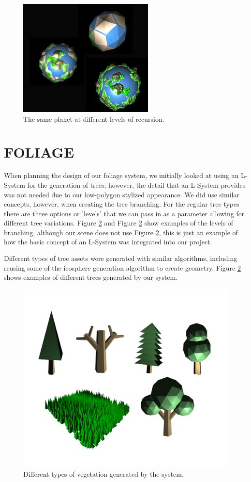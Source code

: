 \documentclass[a4paper,twoside]{article}
\begin{document}
\begin{figure}
\centering
\includegraphics[scale=0.75]{./images/planets/planets.png}
\caption{The same planet at different levels of recursion.}
\label{fig_iterations}
\end{figure}

\section{\uppercase{Foliage}}
\label{sec:fol}
\noindent When planning the design of our foliage system, we initially looked at using an L-System for the generation of trees; however, the detail that an L-System provides was not needed due to our low-polygon stylized appearance. We did use similar concepts, however, when creating the tree branching. 
For the regular tree types there are three options or 'levels' that we can pass in as a parameter allowing for different tree variations. Figure \ref{fig_all_trees} and Figure \ref{fig_all_trees} show examples of the levels of branching, although our scene does not use Figure \ref{fig_all_trees}, this is just an example of how the basic concept of an L-System was integrated into our project.

Different types of tree assets were generated with similar algorithms, including reusing some of the icosphere generation algorithm to create geometry. Figure \ref{fig_all_trees} shows examples of different trees generated by our system.

\begin{figure}
\centering
\includegraphics[scale=0.3]{./images/trees/alltrees.png}
\caption{Different types of vegetation generated by the system.}
\label{fig_all_trees}
\end{figure}


{\small
}
\vfill
\end{document}

